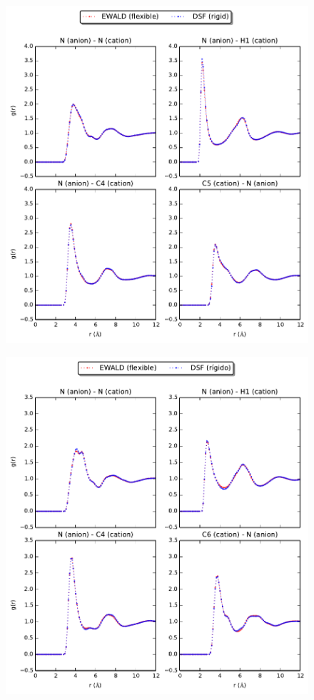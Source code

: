 \documentclass[3p,onecolumn]{elsarticle}
\begin{document}
\begin{figure}[ht]
\includegraphics[]{rdf-Batista}
\caption{\ce{[emim][B(CN)_4]}}
\label{fig:rdf-Batista}
\end{figure}


\begin{figure}[ht]
\includegraphics[]{rdf-Liu}
\caption{\ce{[emim][B(CN)_4]}}
\label{fig:rdf-Liu}
\end{figure}
\end{document}
